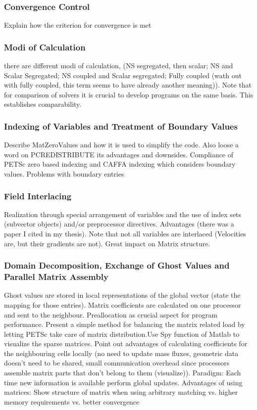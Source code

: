 \documentclass[article,type=msc,colorback,accentcolor=tud2a]{tudthesis}
\begin{document}
        \subsubsection{Convergence Control} 
        Explain how the criterion for convergence is met 

        \subsubsection{Modi of Calculation}
          there are different modi of calculation, (NS segregated, then scalar; NS and Scalar Segregated; NS coupled and Scalar segregated; Fully coupled (wath out with fully coupled, this term seems to have already another meaning)). Note that for comparison of solvers it is crucial to develop programs on the same basis. This establishes comparability.

      \subsubsection{Indexing of Variables and Treatment of Boundary Values}
      Describe MatZeroValues and how it is used to simplify the code. Also loose a word on PCREDISTRIBUTE its advantages and downsides. Compliance of PETSc zero based indexing and CAFFA indexing which considers boundary values. Problems with boundary entries
      \subsubsection{Field Interlacing}
      Realization through special arrangement of variables and the use of index sets (subvector objects) and/or preprocessor directives. Advantages (there was a paper I cited in my thesis). Note that not all variables are interlaced (Velocities are, but their gradients are not). Great impact on Matrix structure.
      \subsubsection{Domain Decomposition, Exchange of Ghost Values and Parallel Matrix Assembly}

      Ghost values are stored in local representations of the global vector (state the mapping for those entries). Matrix coefficients are calculated on one processor and sent to the neighbour. Preallocation as crucial aspect for program performance. Present a simple method for balancing the matrix related load by letting PETSc take care of matrix distribution.Use Spy function of Matlab to visualize the sparse matrices. Point out advantages of calculating coefficients for the neighbouring cells locally (no need to update mass fluxes, geometric data doesn't need to be shared, small communication overhead since processors assemble matrix parts that don't belong to them (visualize)). Paradigm: Each time new information is available perform global updates. Advantages of using matrices: Show structure of matrix when using arbitrary matching vs. higher memory requirements vs. better convergence
\end{document}
